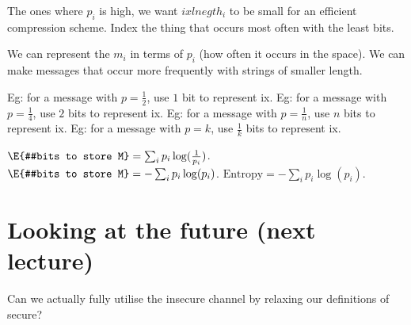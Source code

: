 The ones where $p_i$ is high, we want $ixlnegth_i$ to be small for an efficient compression scheme.
Index the thing that occurs most often with the least bits.

We can represent the  $m_i$ in terms of $p_i$ (how often it occurs in the space).
We can make messages that occur more frequently with strings of smaller length.

Eg: for a message with $p = \frac{1}{2}$, use $1$ bit to represent ix.
Eg: for a message with $p = \frac{1}{4}$, use $2$ bits to represent ix.
Eg: for a message with $p = \frac{1}{n}$, use $n$ bits to represent ix.
Eg: for a message with $p = k$, use $\frac{1}{k}$ bits to represent ix.

$\E{#bits to store M} =  \sum_{i}p_i \log(\frac{1}{p_i})$.
$\E{#bits to store M} = - \sum_{i}p_i \log(p_i)$.
$\text{Entropy} = - \sum_{i}p_i \log(p_i)$.


\section{Looking at the future (next lecture)}

Can we actually fully utilise the insecure channel by relaxing our definitions of secure?

